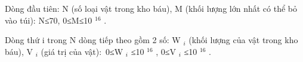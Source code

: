 Dòng đầu tiên: N (số loại vật trong kho báu), M (khối lượng lớn nhất có thể bỏ vào túi): N≤70, 0≤M≤10 $^ 16 $ .

Dòng thứ i trong N dòng tiếp theo gồm 2 số: W $_ i $ (khối lượng của vật trong kho báu), V $_ i $ (giá trị của vật): 0≤W $_ i $ ≤10 $^ 16 $ , 0≤V $_ i $ ≤10 $^ 16 $ .